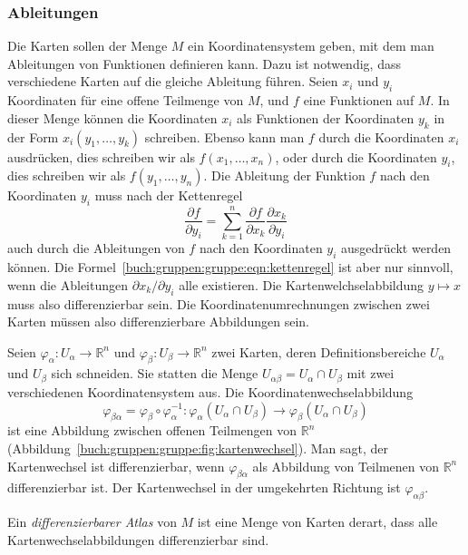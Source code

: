 \subsubsection{Ableitungen}

Die Karten sollen der Menge $M$ ein Koordinatensystem geben, mit dem
man Ableitungen von Funktionen definieren kann.
Dazu ist notwendig, dass verschiedene Karten auf die gleiche
Ableitung führen.
Seien $x_i$ und $y_i$ Koordinaten für eine offene Teilmenge von $M$,
und $f$ eine Funktionen auf $M$.
In dieser Menge können die Koordinaten $x_i$ als Funktionen der 
Koordinaten $y_k$ in der Form $x_i(y_1,\dots,y_k)$ schreiben.
Ebenso kann man $f$ durch die Koordinaten $x_i$ ausdrücken, dies
schreiben wir als $f(x_1,\dots,x_n)$, oder durch die Koordinaten $y_i$,
dies schreiben wir als $f(y_1,\dots,y_n)$.
Die Ableitung der Funktion $f$ nach den Koordinaten $y_i$ muss nach
der Kettenregel
\begin{equation}
\frac{\partial f}{\partial y_i}
=
\sum_{k=1}^n
\frac{\partial f}{\partial x_k} \frac{\partial x_k}{\partial y_i}
\label{buch:gruppen:gruppe:eqn:kettenregel}
\end{equation}
auch durch die Ableitungen von $f$ nach den Koordinaten $y_i$
ausgedrückt werden können.
Die Formel~\ref{buch:gruppen:gruppe:eqn:kettenregel} ist aber nur sinnvoll,
wenn die Ableitungen $\partial x_k/\partial y_i$ alle existieren.
Die Kartenwelchselabbildung $y\mapsto x$ muss also differenzierbar sein.
Die Koordinatenumrechnungen zwischen zwei Karten müssen also differenzierbare
Abbildungen sein.

Seien 
$\varphi_\alpha\colon U_\alpha \to \mathbb{R}^n$
und
$\varphi_\beta\colon U_\beta \to \mathbb{R}^n$
zwei Karten, deren Definitionsbereiche $U_\alpha$ und $U_\beta$ sich
schneiden.
Sie statten die Menge $U_{\alpha\beta}=U_\alpha\cap U_\beta$
mit zwei verschiedenen Koordinatensystem aus.
Die Koordinatenwechselabbildung
\[
\varphi_{\beta\alpha}
=
\varphi_\beta
\circ
\varphi_\alpha^{-1}
\colon
\varphi_\alpha(U_\alpha\cap U_\beta)
\to
\varphi_\beta(U_\alpha\cap U_\beta)
\]
ist eine Abbildung zwischen offenen Teilmengen von $\mathbb{R}^n$
(Abbildung~\ref{buch:gruppen:gruppe:fig:kartenwechsel}).
Man sagt, der Kartenwechsel ist differenzierbar, wenn $\varphi_{\beta\alpha}$
als Abbildung von Teilmenen von $\mathbb{R}^n$
differenzierbar ist.
Der Kartenwechsel in der umgekehrten Richtung ist $\varphi_{\alpha\beta}$.

\begin{definition}
\label{buch:gruppen:gruppe:def:atlas}
Ein {\em differenzierbarer Atlas} von $M$ ist eine Menge von Karten derart,
dass alle Kartenwechselabbildungen differenzierbar sind.
\end{definition}

